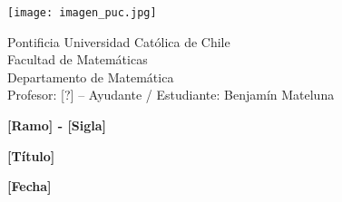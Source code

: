\documentclass{article}
\begin{document}
\begin{minipage}{2.5cm}
    \texttt{[image: imagen\_puc.jpg]}
\end{minipage}
\begin{minipage}{14cm}
    {\sc Pontificia Universidad Católica de Chile\\
    Facultad de Matemáticas\\
    Departamento de Matemática\\
    Profesor: [?] -- Ayudante / Estudiante: Benjamín Mateluna}
\end{minipage}
\vspace{1ex}

{\centerline{\bf [Ramo] - [Sigla]}
\centerline{\bf [Título]}}
\centerline{\bf [Fecha]}



\end{document}
